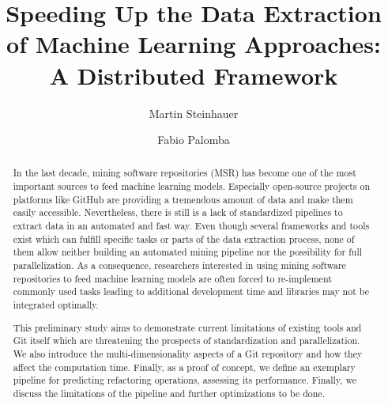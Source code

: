 \documentclass[sigconf,table,screen,xcdraw,review]{acmart}
\newcommand\iris{\textsc{Iris}\xspace}
\begin{document}
\title[Speeding Up the Data Extraction of Machine Learning Approaches]{Speeding Up the Data Extraction of Machine Learning Approaches: A Distributed Framework}

	\author{Martin Steinhauer}

	\author{Fabio Palomba}

\begin{abstract}
In the last decade, mining software repositories (MSR) has become one of the most important sources to feed machine learning models. Especially open-source projects on platforms like GitHub are providing a tremendous amount of data and make them easily accessible. Nevertheless, there is still is a lack of standardized pipelines to extract data in an automated and fast way. Even though several frameworks and tools exist which can fulfill specific tasks or parts of the data extraction process, none of them allow neither building an automated mining pipeline nor the possibility for full parallelization. As a consequence, researchers interested in using mining software repositories to feed machine learning models are often forced to re-implement commonly used tasks leading to additional development time and libraries may not be integrated optimally. 

This preliminary study aims to demonstrate current limitations of existing tools and Git itself which are threatening the prospects of standardization and parallelization. We also introduce the multi-dimensionality aspects of a Git repository and how they affect the computation time. Finally, as a proof of concept, we define an exemplary pipeline for predicting refactoring operations, assessing its performance. Finally, we discuss the limitations of the pipeline and further optimizations to be done.\end{abstract}

\maketitle








\balance


\end{document}
